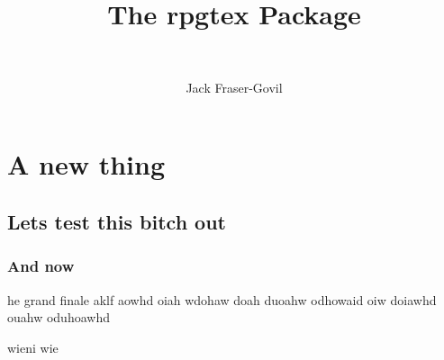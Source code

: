 \documentclass[11pt,theme=default]{rpgbook}
\title{The rpgtex Package}
\subtitle{~}
\author{Jack Fraser-Govil}
\begin{document}
	\frontmatter
	\maketitle{}

	\tableofcontents
	\mainmatter



	\part{A new thing}
		\chapter{Lets test this bitch out}

			\section{And now}

				he grand finale aklf aowhd oiah wdohaw doah duoahw odhowaid oiw doiawhd ouahw oduhoawhd \Blindtext

				wieni wie
				 \Blindtext
\end{document}
